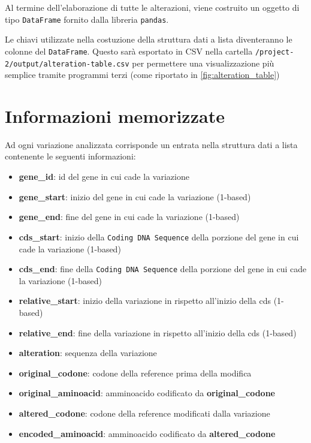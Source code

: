 \documentclass[11pt,italian]{article}
\begin{document}
\noindent
Al termine dell'elaborazione di tutte le alterazioni, viene costruito un oggetto di tipo \lstinline{DataFrame} fornito dalla libreria \lstinline{pandas}.

Le chiavi utilizzate nella costuzione della struttura dati a lista diventeranno le colonne del \lstinline{DataFrame}. Questo sarà esportato in CSV nella cartella \lstinline{/project-2/output/alteration-table.csv} per permettere una visualizzazione più semplice tramite programmi terzi (come riportato in \cref{fig:alteration_table})

\newpage
\section{Informazioni memorizzate}
Ad ogni variazione analizzata corrisponde un entrata nella struttura dati a lista contenente le seguenti informazioni:
\begin{itemize}
    \item \textbf{gene\_id}: id del gene in cui cade la variazione
    \item \textbf{gene\_start}: inizio del gene in cui cade la variazione (1-based)
    \item \textbf{gene\_end}: fine del gene in cui cade la variazione (1-based)
    \item \textbf{cds\_start}: inizio della \lstinline{Coding DNA Sequence} della porzione del gene in cui cade la variazione (1-based)
    \item \textbf{cds\_end}: fine della \lstinline{Coding DNA Sequence} della porzione del gene in cui cade la variazione (1-based)
    \item \textbf{relative\_start}: inizio della variazione in rispetto all'inizio della cds (1-based)
    \item \textbf{relative\_end}: fine della variazione in rispetto all'inizio della cds (1-based)
    \item \textbf{alteration}: sequenza della variazione
    \item \textbf{original\_codone}: codone della reference prima della modifica
    \item \textbf{original\_aminoacid}: amminoacido codificato da \textbf{original\_codone}
    \item \textbf{altered\_codone}: codone della reference modificati dalla variazione
    \item \textbf{encoded\_aminoacid}: amminoacido codificato da \textbf{altered\_codone}
\end{itemize}
\end{document}
